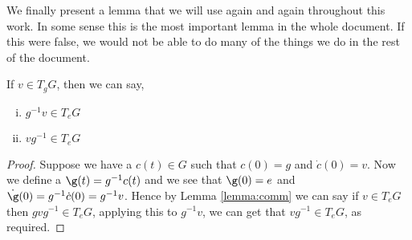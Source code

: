 \noindent
We finally present a lemma that we will use again and again throughout this work. In some sense this is the most important lemma in the whole document. If this were false, we would not be able to do many of the things we do in the rest of the document.
\begin{nlemma}
  If $v \in T_gG$, then we can say,
  \begin{enumerate}[(i)]
    \item $g^{-1}v \in T_eG$
    \item $vg^{-1} \in T_eG$
  \end{enumerate}
\end{nlemma}
{\begin{proof}
  Suppose we have a $c(t) \in G$ such that $c(0) = g$ and $\dot c(0) = v$. Now we define a $\g(t) = g^{-1}c(t)$ and we see that $\g (0) = e$ and $\dot\g(0) = g^{-1}\dot c(0) = g^{-1}v$. Hence by Lemma \ref{lemma:comm} we can say if $v \in T_eG$ then $gvg^{-1} \in T_eG$, applying this to $g^{-1}v$, we can get that $vg^{-1} \in T_eG$, as required.
\end{proof} }
